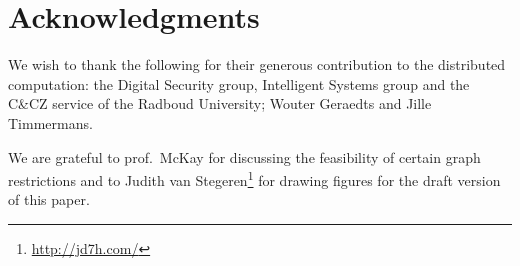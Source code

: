 \documentclass[adraft,copyright,creativecommons]{eptcs}
\newcounter{main}
\theoremstyle{definition}
\theoremstyle{remark}
\begin{document}
\section{Acknowledgments}
We wish to thank the following for their generous contribution to the
distributed computation:
    the Digital Security group, Intelligent Systems group
    and the C\&CZ service of the Radboud University;
    Wouter Geraedts and
    Jille Timmermans.

We are grateful to prof.~McKay for discussing
the feasibility of certain graph restrictions and
to Judith van Stegeren\footnote{\url{http://jd7h.com/}}
for drawing figures for the draft version of this paper.

\clearpage
{}

\end{document}
